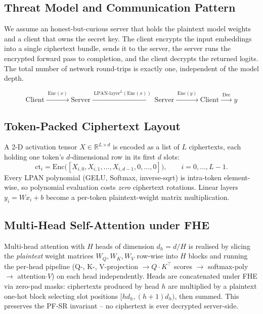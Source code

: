 \subsection{Threat Model and Communication Pattern}
We assume an honest-but-curious server that holds the plaintext model weights and a client that owns the secret key. The client encrypts the input embeddings into a single ciphertext bundle, sends it to the server, the server runs the encrypted forward pass to completion, and the client decrypts the returned logits. The total number of network round-trips is exactly one, independent of the model depth.

\begin{equation}
\text{Client} \xrightarrow{\;\mathrm{Enc}(x)\;} \text{Server} \xrightarrow{\;\mathrm{LPAN\text{-}layer}^L(\mathrm{Enc}(x))\;} \text{Server} \xrightarrow{\;\mathrm{Enc}(y)\;} \text{Client} \xrightarrow{\;\mathrm{Dec}\;} y
\end{equation}

\subsection{Token-Packed Ciphertext Layout}
A 2-D activation tensor $X \in \mathbb{R}^{L \times d}$ is encoded as a list of $L$ ciphertexts, each holding one token's $d$-dimensional row in its first $d$ slots:
\begin{equation}
\mathrm{ct}_i = \mathrm{Enc}\bigl([X_{i,0}, X_{i,1}, \ldots, X_{i,d-1}, 0, \ldots, 0]\bigr), \qquad i = 0, \ldots, L-1.
\end{equation}
Every LPAN polynomial (GELU, Softmax, inverse-sqrt) is intra-token element-wise, so polynomial evaluation costs \emph{zero} ciphertext rotations. Linear layers $y_i = W x_i + b$ become a per-token plaintext-weight matrix multiplication.

\subsection{Multi-Head Self-Attention under FHE}
Multi-head attention with $H$ heads of dimension $d_h = d/H$ is realised by slicing the \emph{plaintext} weight matrices $W_Q, W_K, W_V$ row-wise into $H$ blocks and running the per-head pipeline (Q-, K-, V-projection $\to Q\!\cdot\!K^\top$ scores $\to$ softmax-poly $\to$ attention$\cdot V$) on each head independently. Heads are concatenated under FHE via zero-pad masks: ciphertexts produced by head $h$ are multiplied by a plaintext one-hot block selecting slot positions $[hd_h, (h{+}1)d_h)$, then summed. This preserves the PF-SR invariant -- no ciphertext is ever decrypted server-side.

